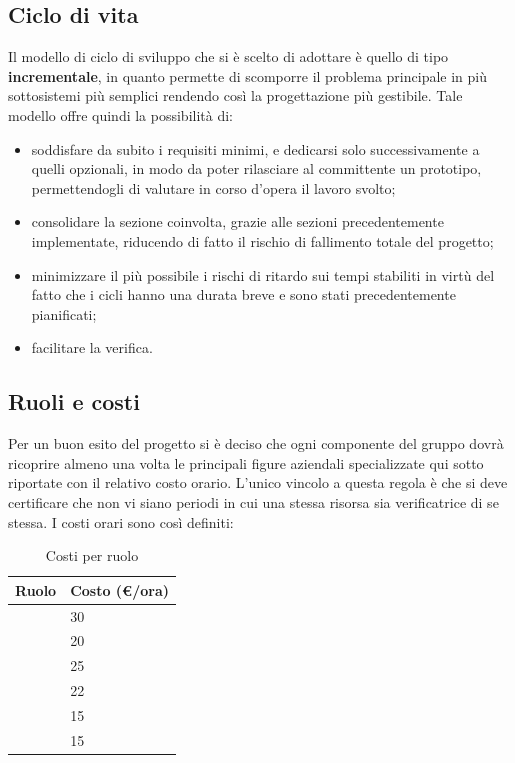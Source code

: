 \documentclass[12pt,a4paper]{article}
\begin{document}
\subsection{Ciclo di vita}
Il modello di ciclo di sviluppo che si è scelto di adottare è quello di tipo \textbf{incrementale}, in quanto permette di scomporre il problema principale in più sottosistemi più semplici rendendo così la progettazione più gestibile. Tale modello offre quindi la possibilità di:
\begin{itemize}
	\item soddisfare da subito i requisiti minimi, e dedicarsi solo successivamente a quelli opzionali, in modo da poter rilasciare al committente un prototipo, permettendogli di valutare in corso d'opera il lavoro svolto;
	\item consolidare la sezione coinvolta, grazie alle sezioni precedentemente implementate, riducendo di fatto il rischio di fallimento totale del progetto;
	\item minimizzare il più possibile i rischi di ritardo sui tempi stabiliti in virtù del fatto che i cicli hanno una durata breve e sono stati precedentemente pianificati;
	\item facilitare la verifica.
\end{itemize}

\subsection{Ruoli e costi}
Per un buon esito del progetto si è deciso che ogni componente del gruppo dovrà ricoprire almeno una volta le principali figure aziendali specializzate qui sotto riportate con il relativo costo orario. L'unico vincolo a questa regola è che si deve certificare che non vi siano periodi in cui una stessa risorsa sia verificatrice di se stessa. I costi orari sono così definiti:
\begin{table}[H]
	\begin{center}
		\begin{tabular}{p{} p{}}
			\toprule
			\textbf{Ruolo} &  \textbf{Costo (\euro/ora)} \\
			\midrule
			\midrule
			\RE &  30 \\
			\midrule
			\AM & 20 \\
			\midrule
			\AN & 25 \\
			\midrule
			\PG & 22 \\
			\midrule
			\PR & 15 \\
			\midrule
			\VR & 15  \\
			\bottomrule
		\end{tabular}
		\caption{Costi per ruolo}
	\end{center}
\end{table}
\end{document}

